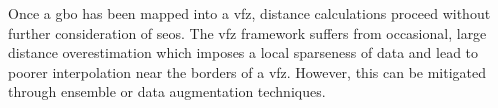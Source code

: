 \documentclass[final,twocolumn,12pt]{elsarticle}
\begin{document}
	Once a \gls{gbo} has been mapped into a \gls{vfz}, distance calculations proceed without further consideration of \glspl{seo}. The \gls{vfz} framework suffers from occasional, large distance overestimation which imposes a local sparseness of data and lead to poorer interpolation near the borders of a \gls{vfz}. However, this can be mitigated through ensemble or data augmentation techniques.
	
	
\end{document}
